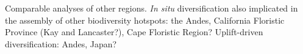 Comparable analyses of other regions. \textit{In situ} diversification also implicated in the assembly of other biodiversity hotspots: the Andes, California Floristic Province (Kay and Lancaster?), Cape Floristic Region? Uplift-driven diversification: Andes, Japan? %

